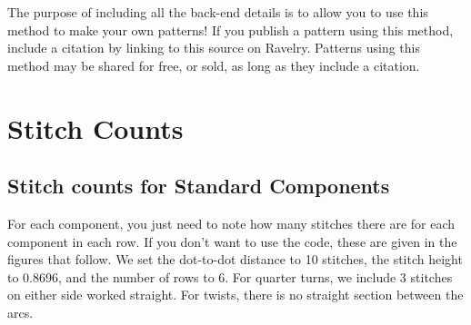 \documentclass[openany]{book}
\begin{document}

The purpose of including all the back-end details is to allow you to use this method to make your own patterns! If you publish a pattern using this method, include a citation by linking to this source on Ravelry. Patterns using this method may be shared for free, or sold, as long as they include a citation.


\appendix
\chapter{Stitch Counts}


\section{Stitch counts for Standard Components}\label{Asec:stitchcounts}


 For each component, you just need to note how many stitches there are for each component in each row. If you don't want to use the code, these are given in the figures that follow. We set  the dot-to-dot distance to 10 stitches, the stitch height to 0.8696, and the number of rows 
to 6. For quarter turns, we include 3 stitches on either side worked straight. For twists, there is no straight section between the arcs.
\end{document}
